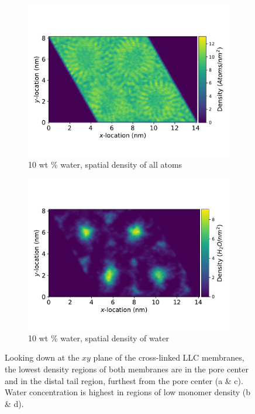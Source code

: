 \documentclass[journal=jpcbfk,manuscript=article]{achemso}
\begin{document}
\begin{figure}[!htb]
\begin{subfigure}{0.45\textwidth}
  \includegraphics[width=\textwidth]{total_density_10wt.pdf}
  \caption{10 wt \% water, spatial density of all atoms}\label{fig:total_density_10wt}
  \end{subfigure}
  \begin{subfigure}{0.45\textwidth}
  \vspace{-0.5cm}
  \includegraphics[width=\textwidth]{total_water_density_10wt.pdf}
  \caption{10 wt \% water, spatial density of water}\label{fig:total_water_density_10wt}
  \end{subfigure}
  \caption{Looking down at the $xy$ plane of the cross-linked LLC membranes, the lowest
  density regions of both membranes are in the pore center and in the distal tail region,
  furthest from the pore center (a \& c). Water concentration is highest in regions of
  low monomer density (b \& d).}\label{fig:total_density}
  \end{figure}
  
\end{document}
